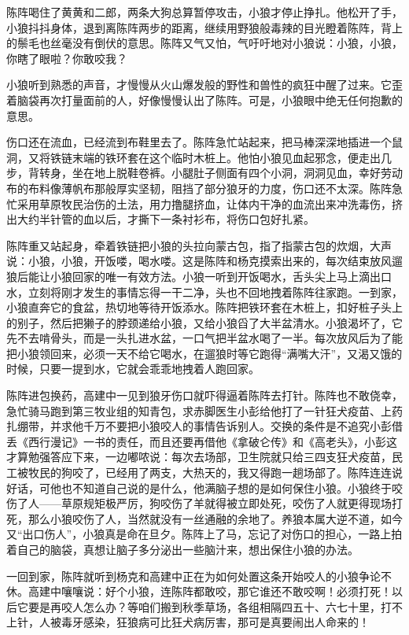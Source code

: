 \par 陈阵喝住了黄黄和二郎，两条大狗总算暂停攻击，小狼才停止挣扎。他松开了手，小狼抖抖身体，退到离陈阵两步的距离，继续用野狼般毒辣的目光瞪着陈阵，背上的鬃毛也丝毫没有倒伏的意思。陈阵又气又怕，气吁吁地对小狼说：小狼，小狼，你瞎了眼啦？你敢咬我？
\par 小狼听到熟悉的声音，才慢慢从火山爆发般的野性和兽性的疯狂中醒了过来。它歪着脑袋再次打量面前的人，好像慢慢认出了陈阵。可是，小狼眼中绝无任何抱歉的意思。
\par 伤口还在流血，已经流到布鞋里去了。陈阵急忙站起来，把马棒深深地插进一个鼠洞，又将铁链末端的铁环套在这个临时木桩上。他怕小狼见血起邪念，便走出几步，背转身，坐在地上脱鞋卷裤。小腿肚子侧面有四个小洞，洞洞见血，幸好劳动布的布料像薄帆布那般厚实坚韧，阻挡了部分狼牙的力度，伤口还不太深。陈阵急忙采用草原牧民治伤的土法，用力撸腿挤血，让体内干净的血流出来冲洗毒伤，挤出大约半针管的血以后，才撕下一条衬衫布，将伤口包好扎紧。
\par 陈阵重又站起身，牵着铁链把小狼的头拉向蒙古包，指了指蒙古包的炊烟，大声说：小狼，小狼，开饭喽，喝水喽。这是陈阵和杨克摸索出来的，每次结束放风遛狼后能让小狼回家的唯一有效方法。小狼一听到开饭喝水，舌头尖上马上滴出口水，立刻将刚才发生的事情忘得一干二净，头也不回地拽着陈阵往家跑。一到家，小狼直奔它的食盆，热切地等待开饭添水。陈阵把铁环套在木桩上，扣好桩子头上的别子，然后把獭子的脖颈递给小狼，又给小狼舀了大半盆清水。小狼渴坏了，它先不去啃骨头，而是一头扎进水盆，一口气把半盆水喝了一半。每次放风后为了能把小狼领回来，必须一天不给它喝水，在遛狼时等它跑得“满嘴大汗”，又渴又饿的时候，只要一提到水，它就会乖乖地拽着人跑回家。
\par 陈阵进包换药，高建中一见到狼牙伤口就吓得逼着陈阵去打针。陈阵也不敢侥幸，急忙骑马跑到第三牧业组的知青包，求赤脚医生小彭给他打了一针狂犬疫苗、上药扎绷带，并求他千万不要把小狼咬人的事情告诉别人。交换的条件是不追究小彭借丢《西行漫记》一书的责任，而且还要再借他《拿破仑传》和《高老头》，小彭这才算勉强答应下来，一边嘟哝说：每次去场部，卫生院就只给三四支狂犬疫苗，民工被牧民的狗咬了，已经用了两支，大热天的，我又得跑一趟场部了。陈阵连连说好话，可他也不知道自己说的是什么，他满脑子想的是如何保住小狼。小狼终于咬伤了人——草原规矩极严厉，狗咬伤了羊就得被立即处死，咬伤了人就更得现场打死，那么小狼咬伤了人，当然就没有一丝通融的余地了。养狼本属大逆不道，如今又“出口伤人”，小狼真是命在旦夕。陈阵上了马，忘记了对伤口的担心，一路上拍着自己的脑袋，真想让脑子多分泌出一些脑汁来，想出保住小狼的办法。
\par 一回到家，陈阵就听到杨克和高建中正在为如何处置这条开始咬人的小狼争论不休。高建中嚷嚷说：好个小狼，连陈阵都敢咬，那它谁还不敢咬啊！必须打死！以后它要是再咬人怎么办？等咱们搬到秋季草场，各组相隔四五十、六七十里，打不上针，人被毒牙感染，狂狼病可比狂犬病厉害，那可是真要闹出人命来的！
